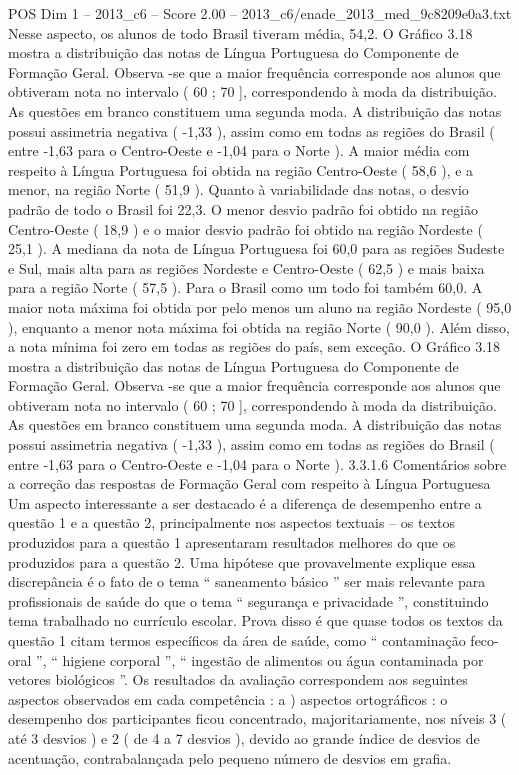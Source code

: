 \begin{textsample}{POS Dim 1 – 2013\_c6 – Score 2.00 – 2013\_c6/enade\_2013\_med\_9c8209e0a3.txt}
Nesse aspecto, os alunos de todo Brasil tiveram média, 54,2.
O Gráfico 3.18 mostra a distribuição das notas de Língua Portuguesa do Componente de Formação Geral.
Observa -se que a maior frequência corresponde aos alunos que obtiveram nota no intervalo ( 60 ; 70 ], correspondendo à moda da distribuição.
As questões em branco constituem uma segunda moda.
A distribuição das notas possui assimetria negativa ( -1,33 ), assim como em todas as regiões do Brasil ( entre -1,63 para o Centro-Oeste e -1,04 para o Norte ).
A maior média com respeito à Língua Portuguesa foi obtida na região Centro-Oeste ( 58,6 ), e a menor, na região Norte ( 51,9 ).
Quanto à variabilidade das notas, o desvio padrão de todo o Brasil foi 22,3.
O menor desvio padrão foi obtido na região Centro-Oeste ( 18,9 ) e o maior desvio padrão foi obtido na região Nordeste ( 25,1 ).
A mediana da nota de Língua Portuguesa foi 60,0 para as regiões Sudeste e Sul, mais alta para as regiões Nordeste e Centro-Oeste ( 62,5 ) e mais baixa para a região Norte ( 57,5 ).
Para o Brasil como um todo foi também 60,0.
A maior nota máxima foi obtida por pelo menos um aluno na região Nordeste ( 95,0 ), enquanto a menor nota máxima foi obtida na região Norte ( 90,0 ).
Além disso, a nota mínima foi zero em todas as regiões do país, sem exceção.
O Gráfico 3.18 mostra a distribuição das notas de Língua Portuguesa do Componente de Formação Geral.
Observa -se que a maior frequência corresponde aos alunos que obtiveram nota no intervalo ( 60 ; 70 ], correspondendo à moda da distribuição.
As questões em branco constituem uma segunda moda.
A distribuição das notas possui assimetria negativa ( -1,33 ), assim como em todas as regiões do Brasil ( entre -1,63 para o Centro-Oeste e -1,04 para o Norte ). 3.3.1.6 Comentários sobre a correção das respostas de Formação Geral com respeito à Língua Portuguesa Um aspecto interessante a ser destacado é a diferença de desempenho entre a questão 1 e a questão 2, principalmente nos aspectos textuais – os textos produzidos para a questão 1 apresentaram resultados melhores do que os produzidos para a questão 2.
Uma hipótese que provavelmente explique essa discrepância é o fato de o tema “ saneamento básico ” ser mais relevante para profissionais de saúde do que o tema “ segurança e privacidade ”, constituindo tema trabalhado no currículo escolar.
Prova disso é que quase todos os textos da questão 1 citam termos específicos da área de saúde, como “ contaminação feco-oral ”, “ higiene corporal ”, “ ingestão de alimentos ou água contaminada por vetores biológicos ”.
Os resultados da avaliação correspondem aos seguintes aspectos observados em cada competência : a ) aspectos ortográficos : o desempenho dos participantes ficou concentrado, majoritariamente, nos níveis 3 ( até 3 desvios ) e 2 ( de 4 a 7 desvios ), devido ao grande índice de desvios de acentuação, contrabalançada pelo pequeno número de desvios em grafia.

\end{textsample}

